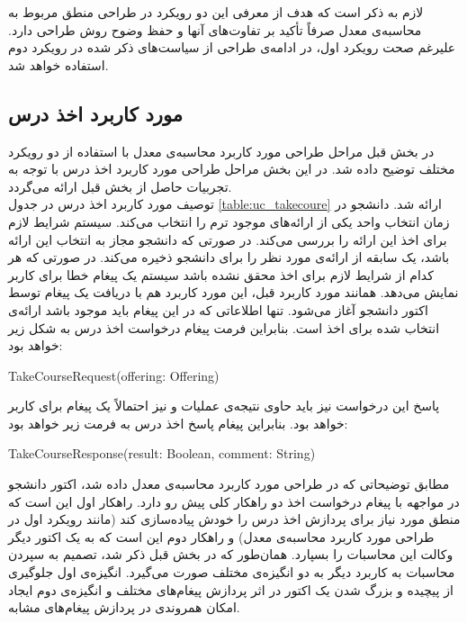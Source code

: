 \begin{enumerate}
\end{enumerate}
لازم به ذکر است که هدف از معرفی این دو رویکرد در طراحی منطق مربوط به محاسبه‌ی معدل صرفاً تأکید بر تفاوت‌های آنها و حفظ وضوح روش طراحی دارد. علیرغم صحت رویکرد اول، در ادامه‌ی طراحی از سیاست‌های ذکر شده در رویکرد دوم استفاده خواهد شد.
\subsection{مورد کاربرد اخذ درس}
\label{subsection:take_course_uc_design}
در بخش قبل مراحل طراحی مورد کاربرد محاسبه‌ی معدل با استفاده از دو رویکرد مختلف توضیح داده شد. در این بخش مراحل طراحی مورد کاربرد اخذ درس با توجه به تجربیات حاصل از بخش قبل ارائه می‌گردد. \\
توصیف مورد کاربرد اخذ درس در جدول \ref{table:uc_takecoure} ارائه شد. دانشجو در زمان انتخاب واحد یکی از ارائه‌های موجود ترم را انتخاب می‌کند. سیستم شرایط لازم برای اخذ این ارائه را بررسی می‌کند. در صورتی که دانشجو مجاز به انتخاب این ارائه باشد، یک سابقه از ارائه‌ی مورد نظر را برای دانشجو ذخیره می‌کند. در صورتی که هر کدام از شرایط لازم برای اخذ محقق نشده باشد سیستم یک پیغام خطا برای کاربر نمایش می‌دهد.
همانند مورد کاربرد قبل،‌ این مورد کاربرد هم با دریافت یک پیغام توسط اکتور دانشجو آغاز می‌شود. تنها اطلاعاتی که در این پیغام باید موجود باشد ارائه‌ی انتخاب شده برای اخذ است. بنابراین فرمت پیغام درخواست اخذ درس به شکل زیر خواهد بود:
\begin{latin}
TakeCourseRequest(offering: Offering)
\end{latin}
پاسخ این درخواست نیز باید حاوی نتیجه‌ی عملیات و نیز احتمالاً یک پیغام برای کاربر خواهد بود. بنابراین پیغام پاسخ اخذ درس به فرمت زیر خواهد بود:
\begin{latin}
TakeCourseResponse(result: Boolean, comment: String)
\end{latin}
مطابق توضیحاتی که در طراحی مورد کاربرد محاسبه‌ی معدل داده ‌شد، اکتور دانشجو در مواجهه با پیغام درخواست اخذ دو راهکار کلی پیش رو دارد. راهکار اول این است که منطق مورد نیاز برای پردازش اخذ درس را خودش پیاده‌سازی کند (مانند رویکرد اول در طراحی مورد کاربرد محاسبه‌ی معدل) و راهکار دوم این است که به یک اکتور دیگر وکالت این محاسبات را بسپارد. همان‌طور که در بخش قبل ذکر شد،‌ تصمیم به سپردن محاسبات به کاربرد دیگر به دو انگیزه‌ی مختلف صورت می‌گیرد. انگیزه‌ی اول جلوگیری از پیچیده و بزرگ شدن یک اکتور در اثر پردازش پیغام‌های مختلف و انگیزه‌ی دوم ایجاد امکان همروندی در پردازش پیغام‌های مشابه.\\
